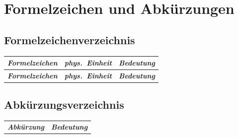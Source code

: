 \chapter*{Formelzeichen und Abk\"urzungen}

\section*{Formelzeichenverzeichnis}
\enlargethispage{-4cm}

\renewcommand{\arraystretch}{1.3}
\setlength{\tabcolsep}{30pt}
\begin{longtable}[l]{l l l}
\bfseries \emph{Formelzeichen} & \bfseries \emph{phys.\ Einheit} & \bfseries \emph{Bedeutung}\\
\endfirsthead
\bfseries \emph{Formelzeichen} & \bfseries \emph{phys.\ Einheit} & \bfseries \emph{Bedeutung}\\
\endhead
\end{longtable}

\clearpage
\section*{Abk\"urzungsverzeichnis}

\begin{table}[!h]
\setlength{\tabcolsep}{50pt}
    \centering
        \begin{tabular}[t]{l l}
\bfseries \emph{Abk\"urzung} & \bfseries \emph{Bedeutung}\\
        \end{tabular}
\end{table}
\normalsize
\normalfont
